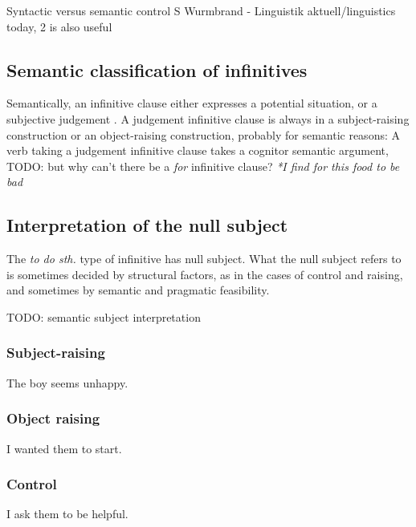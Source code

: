 \documentclass[UTF8, a4paper, oneside, scheme=plain, 12pt]{ctexbook}
\newcommand*{\citepage}[1]{p.~{#1}}
\newcommand{\form}[1]{\emph{#1}}
\begin{document}
Syntactic versus semantic control
S Wurmbrand - Linguistik aktuell/linguistics today, 2 is also useful


\subsection{Semantic classification of infinitives}

Semantically, an infinitive clause either expresses a potential situation,
or a subjective judgement \citep[\citepage{245}]{dixon2005semantic}.
A judgement infinitive clause 
is always in a subject-raising construction or an object-raising construction,
probably for semantic reasons:
A verb taking a judgement infinitive clause 
takes a cognitor semantic argument,
TODO: but why can't there be a \form{for} infinitive clause? 
\form{*I find for this food to be bad}

\subsection{Interpretation of the null subject}

The \form{to do sth.} type of infinitive has null subject.
What the null subject refers to is sometimes decided by structural factors,
as in the cases of control and raising,
and sometimes by semantic and pragmatic feasibility.

TODO: semantic subject interpretation



\subsubsection{Subject-raising}

\begin{exe}
    \ex The boy seems unhappy.
\end{exe}

\subsubsection{Object raising}

\begin{exe}
    \ex I wanted them to start.
\end{exe}

\subsubsection{Control}

\begin{exe}
    \ex I ask them to be helpful.
\end{exe}
\end{document}

